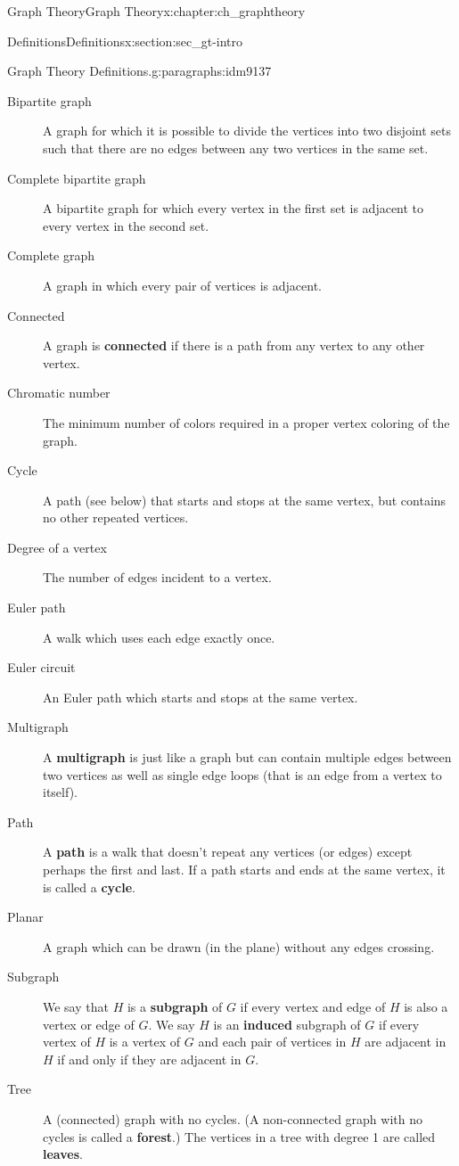 \documentclass[oneside,10pt,]{book}
\newcommand{\terminology}[1]{\textbf{#1}}
\numberwithin{equation}{chapter}
\begin{document}
\begin{chapterptx}{Graph Theory}{}{Graph Theory}{}{}{x:chapter:ch_graphtheory}
\begin{sectionptx}{Definitions}{}{Definitions}{}{}{x:section:sec_gt-intro}
\begin{paragraphs}{Graph Theory Definitions.}{g:paragraphs:idm9137}
\begin{description}
\item[{Bipartite graph}] A graph for which it is possible to divide the vertices into two disjoint sets such that there are no edges between any two vertices in the same set.%
\item[{Complete bipartite graph}]A bipartite graph for which every vertex in the first set is adjacent to every vertex in the second set.%
\item[{Complete graph}] A graph in which every pair of vertices is adjacent.%
\item[{Connected}] A graph is \terminology{connected} if there is a path from any vertex to any other vertex.%
\item[{Chromatic number}] The minimum number of colors required in a proper vertex coloring of the graph.%
\item[{Cycle}] A path (see below) that starts and stops at the same vertex, but contains no other repeated vertices.%
\item[{Degree of a vertex}] The number of edges incident to a vertex.%
\item[{Euler path}]A walk which uses each edge exactly once.%
\item[{Euler circuit}] An Euler path which starts and stops at the same vertex.%
\item[{Multigraph}] A \terminology{multigraph} is just like a graph but can contain multiple edges between two vertices as well as single edge loops (that is an edge from a vertex to itself).%
\item[{Path}]A \terminology{path} is a walk that doesn't repeat any vertices (or edges) except perhaps the first and last.  If a path starts and ends at the same vertex, it is called a \terminology{cycle}.%
\item[{Planar}] A graph which can be drawn (in the plane) without any edges crossing.%
\item[{Subgraph}] We say that \(H\) is a \terminology{subgraph} of \(G\) if every vertex and edge of \(H\) is also a vertex or edge of \(G\). We say \(H\) is an \terminology{induced} subgraph of \(G\) if every vertex of \(H\) is a vertex of \(G\) and each pair of vertices in \(H\) are adjacent in \(H\) if and only if they are adjacent in \(G\).%
\item[{Tree}] A (connected) graph with no cycles. (A non-connected graph with no cycles is called a \terminology{forest}.) The vertices in a tree with degree 1 are called \terminology{leaves}.%

\end{description}
\end{paragraphs}
\end{sectionptx}
\end{chapterptx}
\end{document}
